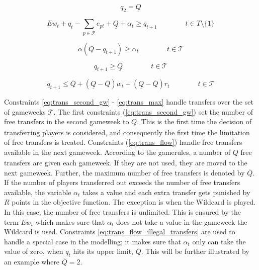 \begin{equation} \label{eq:trans_second_gw}
    q_{2} = \underline{Q}
\end{equation}

\begin{equation} \label{eq:trans_flow}
   E w_{t} + q_{t}-\sum_{p \in \mathcal{P}}e_{pt} + \underline{Q} + \alpha_{t} \geq q_{t+1} \qquad\qquad t \in T\setminus\{1\}
\end{equation}


\begin{equation} \label{eq:trans_flow_illegal_transfers}
    \bar{\alpha}(\overline{Q}-q_{t+1}) \geq \alpha_{t} \qquad\qquad t \in \mathcal{T}
\end{equation}

\begin{equation} \label{eq:trans_min}
    q_{t+1} \geq \underline{Q} \qquad\qquad t \in \mathcal{T}
\end{equation}

\begin{equation} \label{eq:trans_max}
    q_{t+1} \leq \overline{Q} + (\underline{Q}-\overline{Q})w_{t} + (\underline{Q}-\overline{Q})r_{t} \qquad\qquad t \in \mathcal{T}
\end{equation}

\newpar

Constraints \eqref{eq:trans_second_gw} - \eqref{eq:trans_max} handle transfers over the set of gameweeks $\mathcal{T}$. The first constraints (\ref{eq:trans_second_gw}) set the number of free transfers in the second gameweek to $\underline{Q}$. This is the first time the decision of transferring players is considered, and consequently the first time the limitation of free transfers is treated. Constraints (\ref{eq:trans_flow}) handle free transfers available in the next gameweek. According to the gamerules, a number of $\underline{Q}$ free transfers are given each gameweek. If they are not used, they are moved to the next gameweek. Further, the maximum number of free transfers is denoted by $\overline{Q}$. If the number of players transferred out exceeds the number of free transfers available, the variable $\alpha_{t}$ takes a value and each extra transfer gets punished by $R$ points in the objective function. The exception is when the Wildcard is played. In this case, the number of free transfers is unlimited. This is ensured by the term $E w_{t}$ which makes sure that $\alpha_{t}$ does not take a value in the gameweek the Wildcard is used. Constraints \eqref{eq:trans_flow_illegal_transfers} are used to handle a special case in the modelling; it makes sure that $\alpha_{t}$ only can take the value of zero, when $q_{t}$ hits its upper limit, $\overline{Q}$. This will be further illustrated by an example where $\overline{Q} = 2$. 


